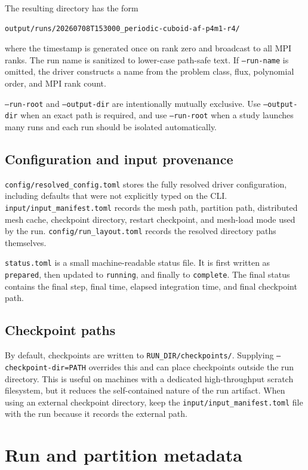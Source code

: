 \documentclass[11pt,oneside]{book}
\newcommand{\code}[1]{\texttt{#1}}
\begin{document}
The resulting directory has the form
\begin{lstlisting}[language=bash]
output/runs/20260708T153000_periodic-cuboid-af-p4m1-r4/
\end{lstlisting}
where the timestamp is generated once on rank zero and broadcast to all MPI
ranks. The run name is sanitized to lower-case path-safe text. If
\code{--run-name} is omitted, the driver constructs a name from the problem
class, flux, polynomial order, and MPI rank count.

\code{--run-root} and \code{--output-dir} are intentionally mutually
exclusive. Use \code{--output-dir} when an exact path is required, and use
\code{--run-root} when a study launches many runs and each run should be
isolated automatically.

\subsection{Configuration and input provenance}

\code{config/resolved\_config.toml} stores the fully resolved driver
configuration, including defaults that were not explicitly typed on the CLI.
\code{input/input\_manifest.toml} records the mesh path, partition path,
distributed mesh cache, checkpoint directory, restart checkpoint, and mesh-load
mode used by the run. \code{config/run\_layout.toml} records the resolved
directory paths themselves.

\code{status.toml} is a small machine-readable status file. It is first written
as \code{prepared}, then updated to \code{running}, and finally to
\code{complete}. The final status contains the final step, final time, elapsed
integration time, and final checkpoint path.

\subsection{Checkpoint paths}

By default, checkpoints are written to \code{RUN\_DIR/checkpoints/}. Supplying
\code{--checkpoint-dir=PATH} overrides this and can place checkpoints outside
the run directory. This is useful on machines with a dedicated high-throughput
scratch filesystem, but it reduces the self-contained nature of the run
artifact. When using an external checkpoint directory, keep the
\code{input/input\_manifest.toml} file with the run because it records the
external path.

\section{Run and partition metadata}
\end{document}
